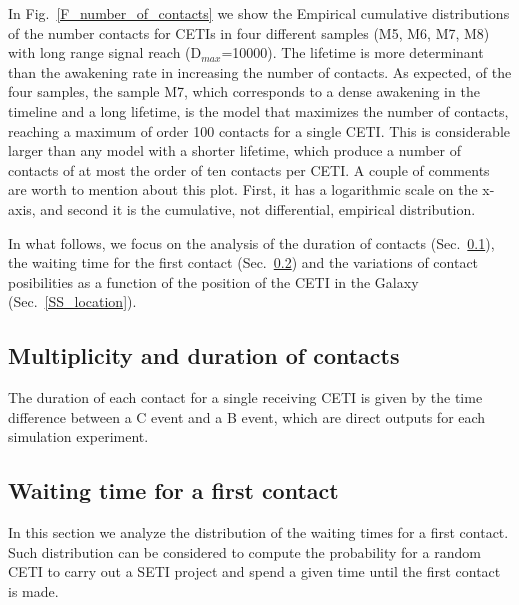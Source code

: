 \documentclass[crop]{CSLB}%
\begin{document}
In Fig.~\ref{F_number_of_contacts} we show the Empirical cumulative
distributions of the number contacts for CETIs in four different
samples (M5, M6, M7, M8) with long range signal reach
(D$_{max}$=10000). 
%
The lifetime is more determinant than the awakening rate in increasing
the number of contacts.
%
As expected, of the four samples, the sample M7, which corresponds to
a dense awakening in the timeline and a long lifetime, is the model
that maximizes the number of contacts, reaching a maximum of order 100
contacts for a single CETI.
%
This is considerable larger than any model with a shorter lifetime,
which produce a number of contacts of at most the order of ten
contacts per CETI.
%
A couple of comments are worth to mention about this plot.
%
First, it has a logarithmic scale on the x-axis, and second it is the
cumulative, not differential, empirical distribution.
 

In what follows, we focus on the analysis of the duration of contacts
(Sec.~\ref{SS_multiplicity}), the waiting time for the first contact
(Sec.~\ref{SS_waiting}) and the
variations of contact posibilities as a function of the position of
the CETI in the Galaxy (Sec.~\ref{SS_location}).


         
 
                              
                                

\subsection{Multiplicity and duration of contacts}\label{SS_multiplicity}

The duration of each contact for a single receiving CETI is given by the
time difference between a C event and a B event, which are direct
outputs for each simulation experiment.






\subsection{Waiting time for a first contact}\label{SS_waiting}

In this section we analyze the distribution of the waiting times for
a first contact.
%
Such distribution can be considered to compute the probability for a
random CETI to carry out a SETI project and spend a given time until
the first contact is made. 
\end{document}
